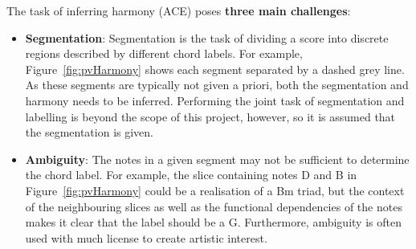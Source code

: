\documentclass[12pt,a4paper,twoside,openright]{report} \usepackage[pdfborder={0 0 0}]{hyperref}    %
\theoremstyle{definition} \newtheorem{definition}{Definition}[section]
\begin{document}
The task of inferring harmony (ACE) poses \textbf{three main challenges}: \begin{itemize} \item \textbf{Segmentation}:
  Segmentation is the task of dividing a score into discrete regions described by different chord labels. For example,
  Figure~\ref{fig:pvHarmony} shows each segment separated by a dashed grey line. As these segments are typically not
  given a priori, both the segmentation and harmony needs to be inferred. Performing the joint task of segmentation and
  labelling is beyond the scope of this project, however, so it is assumed that the segmentation is given. \item
  \textbf{Ambiguity}: The notes in a given segment may not be sufficient to determine the chord label. For example, the
  slice containing notes D and B in Figure~\ref{fig:pvHarmony} could be a realisation of a Bm triad, but the context of
  the neighbouring slices as well as the functional dependencies of the notes makes it clear that the label should be
  a G. Furthermore, ambiguity is often used with much license to create artistic interest.


\end{itemize}
\end{document}
